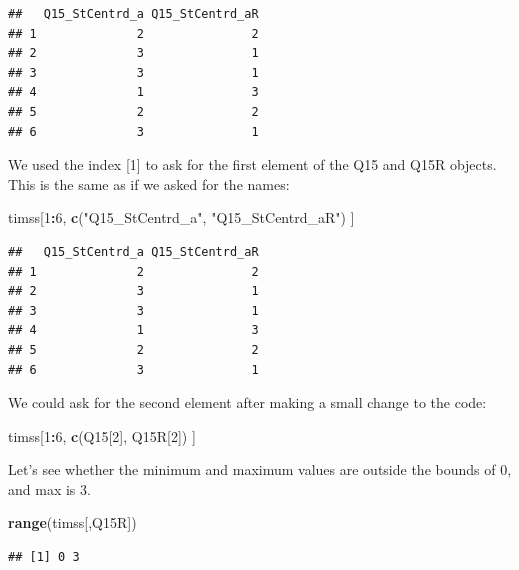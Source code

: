 \documentclass[
]{article}
\newenvironment{Shaded}{\begin{snugshade}}{\end{snugshade}}
\newcommand{\DecValTok}[1]{\textcolor[rgb]{0.00,0.00,0.81}{#1}}
\newcommand{\KeywordTok}[1]{\textcolor[rgb]{0.13,0.29,0.53}{\textbf{#1}}}
\newcommand{\NormalTok}[1]{#1}
\newcommand{\OperatorTok}[1]{\textcolor[rgb]{0.81,0.36,0.00}{\textbf{#1}}}
\newcommand{\StringTok}[1]{\textcolor[rgb]{0.31,0.60,0.02}{#1}}
\begin{document}
\begin{verbatim}
##   Q15_StCentrd_a Q15_StCentrd_aR
## 1              2               2
## 2              3               1
## 3              3               1
## 4              1               3
## 5              2               2
## 6              3               1
\end{verbatim}

We used the index {[}1{]} to ask for the first element of the Q15 and Q15R objects. This is the same as if we asked for the names:

\begin{Shaded}
\begin{Highlighting}[]
\NormalTok{timss[}\DecValTok{1}\OperatorTok{:}\DecValTok{6}\NormalTok{, }\KeywordTok{c}\NormalTok{(}\StringTok{"Q15_StCentrd_a"}\NormalTok{, }\StringTok{"Q15_StCentrd_aR"}\NormalTok{) ]}
\end{Highlighting}
\end{Shaded}

\begin{verbatim}
##   Q15_StCentrd_a Q15_StCentrd_aR
## 1              2               2
## 2              3               1
## 3              3               1
## 4              1               3
## 5              2               2
## 6              3               1
\end{verbatim}

We could ask for the second element after making a small change to the code:

\begin{Shaded}
\begin{Highlighting}[]
\NormalTok{timss[}\DecValTok{1}\OperatorTok{:}\DecValTok{6}\NormalTok{, }\KeywordTok{c}\NormalTok{(Q15[}\DecValTok{2}\NormalTok{], Q15R[}\DecValTok{2}\NormalTok{]) ] }
\end{Highlighting}
\end{Shaded}

Let's see whether the minimum and maximum values are outside the bounds of 0, and max is 3.

\begin{Shaded}
\begin{Highlighting}[]
\KeywordTok{range}\NormalTok{(timss[,Q15R]) }
\end{Highlighting}
\end{Shaded}

\begin{verbatim}
## [1] 0 3
\end{verbatim}
\end{document}
